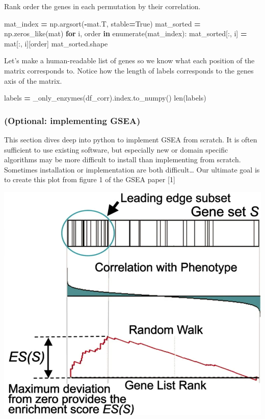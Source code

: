 \documentclass[
]{book}
\newenvironment{Shaded}{\begin{snugshade}}{\end{snugshade}}
\newcommand{\BuiltInTok}[1]{#1}
\newcommand{\ControlFlowTok}[1]{\textcolor[rgb]{0.13,0.29,0.53}{\textbf{#1}}}
\newcommand{\KeywordTok}[1]{\textcolor[rgb]{0.13,0.29,0.53}{\textbf{#1}}}
\newcommand{\NormalTok}[1]{#1}
\newcommand{\OperatorTok}[1]{\textcolor[rgb]{0.81,0.36,0.00}{\textbf{#1}}}
\newcommand{\VariableTok}[1]{\textcolor[rgb]{0.00,0.00,0.00}{#1}}
\begin{document}
Rank order the genes in each permutation by their correlation.

\begin{Shaded}
\begin{Highlighting}[numbers=left,,]
\NormalTok{mat\_index }\OperatorTok{=}\NormalTok{ np.argsort(}\OperatorTok{{-}}\NormalTok{mat.T, stable}\OperatorTok{=}\VariableTok{True}\NormalTok{)}
\NormalTok{mat\_sorted }\OperatorTok{=}\NormalTok{ np.zeros\_like(mat)}
\ControlFlowTok{for}\NormalTok{ i, order }\KeywordTok{in} \BuiltInTok{enumerate}\NormalTok{(mat\_index):}
\NormalTok{    mat\_sorted[:, i] }\OperatorTok{=}\NormalTok{ mat[:, i][order]}
\NormalTok{mat\_sorted.shape}
\end{Highlighting}
\end{Shaded}

Let's make a human-readable list of genes so we know what each position of the matrix corresponds to.
Notice how the length of labels corresponds to the genes axis of the matrix.

\begin{Shaded}
\begin{Highlighting}[numbers=left,,]
\NormalTok{labels }\OperatorTok{=}\NormalTok{ \_only\_enzymes(df\_corr).index.to\_numpy()}
\BuiltInTok{len}\NormalTok{(labels)}
\end{Highlighting}
\end{Shaded}

\subsubsection{(Optional: implementing GSEA)}\label{optional-implementing-gsea}

This section dives deep into python to implement GSEA from scratch.
It is often sufficient to use existing software, but especially new or domain specific algorithms may be more difficult to install
than implementing from scratch. Sometimes installation or implementation are both difficult\ldots{}
Our ultimate goal is to create this plot from figure 1 of the GSEA paper {[}1{]}

\includegraphics[width=0.5\linewidth,height=\textheight,keepaspectratio]{img/lab4/gsea.png}
\end{document}
